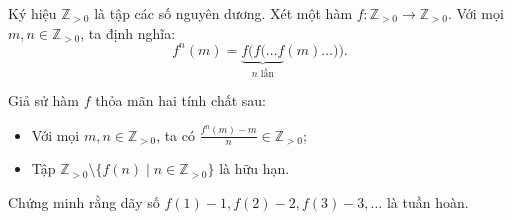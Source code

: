 \ifshowproblem
\begin{problem}\label{example:IMO-2015-SL-P6}
    Ký hiệu \( \mathbb{Z}_{>0} \) là tập các số nguyên dương.  
    Xét một hàm \( f: \mathbb{Z}_{>0} \to \mathbb{Z}_{>0} \). Với mọi \( m, n \in \mathbb{Z}_{>0} \), ta định nghĩa:
    \[
        f^n(m) = \underbrace{f(f(\ldots f}_{n \text{ lần}}(m)\ldots)).
    \]

    Giả sử hàm \( f \) thỏa mãn hai tính chất sau:
    \begin{itemize}[topsep=0pt, partopsep=0pt, itemsep=0pt]
        \item Với mọi \( m, n \in \mathbb{Z}_{>0} \), ta có \( \frac{f^n(m) - m}{n} \in \mathbb{Z}_{>0} \);  
        \item Tập \( \mathbb{Z}_{>0} \setminus \{ f(n) \mid n \in \mathbb{Z}_{>0} \} \) là hữu hạn.
    \end{itemize}

    Chứng minh rằng dãy số \( f(1) - 1, f(2) - 2, f(3) - 3, \ldots \) là tuần hoàn.
\end{problem}
\fi

\footnotemark
{}
\fi